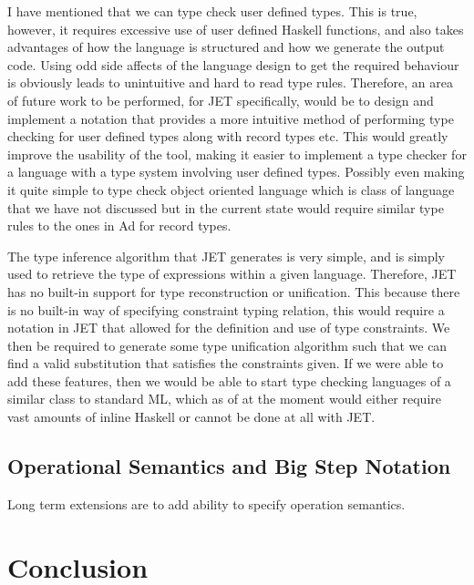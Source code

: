 I have mentioned that we can type check user defined types.
This is true, however, it requires excessive use of user defined Haskell functions, and also takes advantages of how the language is structured and how we generate the output code.
Using odd side affects of the language design to get the required behaviour is obviously leads to unintuitive and hard to read type rules.
Therefore, an area of future work to be performed, for JET specifically, would be to design and implement a notation that provides a more intuitive method of performing type checking for user defined types along with record types etc.
This would greatly improve the usability of the tool, making it easier to implement a type checker for a language with a type system involving user defined types.
Possibly even making it quite simple to type check object oriented language which is class of language that we have not discussed but in the current state would require similar type rules to the ones in Ad for record types.

The type inference algorithm that JET generates is very simple, and is simply used to retrieve the type of expressions within a given language.
Therefore, JET has no built-in support for type reconstruction or unification\cite{pierce2002types,cardelli1996type}.
This because there is no built-in way of specifying constraint typing relation\cite{pierce2002types}, this would require a notation in JET that allowed for the definition and use of type constraints.
We then be required to generate some type unification algorithm such that we can find a valid substitution that satisfies the constraints given. 
If we were able to add these features, then we would be able to start type checking languages of a similar class to standard ML\cite{milner1997definition}, which as of at the moment would either require vast amounts of inline Haskell or cannot be done at all with JET.

\subsection{Operational Semantics and Big Step Notation}
Long term extensions are to add ability to specify operation semantics.

\section{Conclusion}
